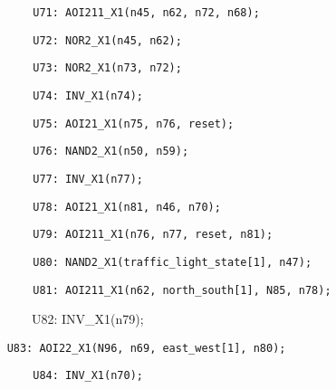 \documentclass[a4paper]{article}
\begin{document}
\begin{center}
\begin{minipage}{6.03611in}
{\color[rgb]{0.0,0.0,0.039215688}
\texttt{\ \ \ \ \ \ \ \ U71: AOI211\_X1(n45, n62, n72, n68);}}

{\color[rgb]{0.0,0.0,0.039215688}
\texttt{\ \ \ \ \ \ \ \ U72: NOR2\_X1(n45, n62);}}

{\color[rgb]{0.0,0.0,0.039215688}
\texttt{\ \ \ \ \ \ \ \ U73: NOR2\_X1(n73, n72);}}

{\color[rgb]{0.0,0.0,0.039215688}
\texttt{\ \ \ \ \ \ \ \ U74: INV\_X1(n74);}}

{\color[rgb]{0.0,0.0,0.039215688}
\texttt{\ \ \ \ \ \ \ \ U75: AOI21\_X1(n75, n76, reset);}}

{\color[rgb]{0.0,0.0,0.039215688}
\texttt{\ \ \ \ \ \ \ \ U76: NAND2\_X1(n50, n59);}}

{\color[rgb]{0.0,0.0,0.039215688}
\texttt{\ \ \ \ \ \ \ \ U77: INV\_X1(n77);}}

{\color[rgb]{0.0,0.0,0.039215688}
\texttt{\ \ \ \ \ \ \ \ U78: AOI21\_X1(n81, n46, n70);}}

{\color[rgb]{0.0,0.0,0.039215688}
\texttt{\ \ \ \ \ \ \ \ U79: AOI211\_X1(n76, n77, reset, n81);}}

{\color[rgb]{0.0,0.0,0.039215688}
\texttt{\ \ \ \ \ \ \ \ U80: NAND2\_X1(traffic\_light\_state[1], n47);}}

{\color[rgb]{0.0,0.0,0.039215688}
\texttt{\ \ \ \ \ \ \ \ U81: AOI211\_X1(n62, north\_south[1], N85,
n78);}}

{\ttfamily\color[rgb]{0.0,0.0,0.039215688}
\ \ \ \ \ \ \ \ U82: INV\_X1(n79);\ }

{\color[rgb]{0.0,0.0,0.039215688}
\texttt{\ \ \ \ U83: AOI22\_X1(N96, n69, east\_west[1], n80);}}

{\color[rgb]{0.0,0.0,0.039215688}
\texttt{\ \ \ \ \ \ \ \ U84: INV\_X1(n70);}}


\bigskip


\bigskip
\end{minipage}
\end{center}

\bigskip


\bigskip


\bigskip


\bigskip


\bigskip


\bigskip


\bigskip


\bigskip


\bigskip


\bigskip


\bigskip
\end{document}
